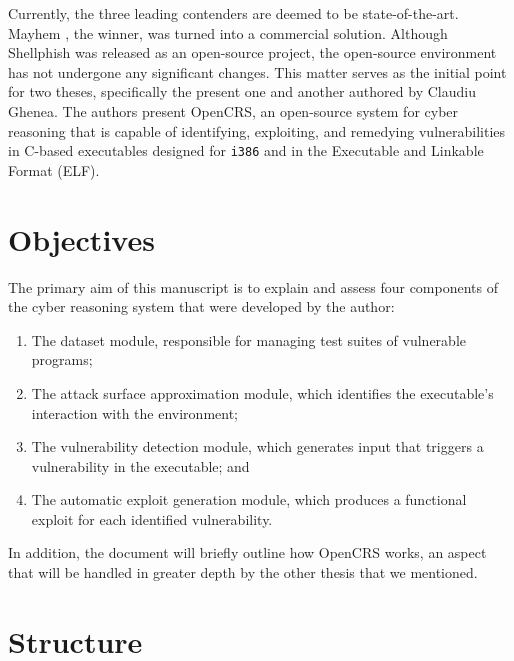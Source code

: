 \documentclass[../main.tex]{subfiles}
\begin{document}
Currently, the three leading contenders are deemed to be
state-of-the-art. Mayhem \cite{mayhem}, the winner, was turned into a commercial
solution. Although Shellphish \cite{shellphish} was released as an open-source
project, the open-source environment has not undergone any
significant changes. This matter serves as the initial point for two
theses, specifically the present one and another \cite{ghenea} authored by Claudiu
Ghenea. The authors present OpenCRS, an open-source system for
cyber reasoning that is capable of identifying, exploiting, and
remedying vulnerabilities in C-based executables designed for
\texttt{i386} and in the Executable and Linkable Format (ELF).

\hypertarget{objectives}{%
\section{Objectives}\label{objectives}}

The primary aim of this manuscript is to explain and assess four
components of the cyber reasoning system that were developed by the
author:

\begin{enumerate}
\def\labelenumi{\arabic{enumi}.}
\tightlist
\item
  The dataset module, responsible for managing test suites of vulnerable
  programs;
\item
  The attack surface approximation module, which identifies the
  executable's interaction with the environment;
\item
  The vulnerability detection module, which generates input that
  triggers a vulnerability in the executable; and
\item
  The automatic exploit generation module, which produces a functional
  exploit for each identified vulnerability.
\end{enumerate}

In addition, the document will briefly outline how OpenCRS works, an
aspect that will be handled in greater depth by the other thesis that we
mentioned.

\hypertarget{structure}{%
\section{Structure}\label{structure}}
\end{document}
